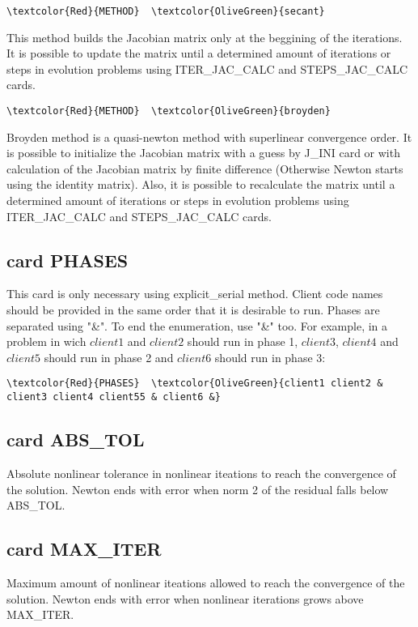 \begin{Verbatim}[frame=single,commandchars=\\\{\}]
\textcolor{Red}{METHOD}  \textcolor{OliveGreen}{secant} 
\end{Verbatim}
This method builds the Jacobian matrix only at the beggining of the iterations. It is possible to update the matrix until a determined amount of iterations or steps in evolution problems using ITER_JAC_CALC and STEPS_JAC_CALC cards.

\begin{Verbatim}[frame=single,commandchars=\\\{\}]
\textcolor{Red}{METHOD}  \textcolor{OliveGreen}{broyden}
\end{Verbatim}
Broyden method is a quasi-newton method with superlinear convergence order. It is possible to initialize the Jacobian matrix with a guess by J_INI card or with calculation of the Jacobian matrix by finite difference (Otherwise Newton starts using the identity matrix). Also, it is possible to recalculate the matrix until a determined amount of iterations or steps in evolution problems using ITER_JAC_CALC and STEPS_JAC_CALC cards.

\subsection{card PHASES}
This card is only necessary using explicit_serial method. Client code names should be provided in the same order that it is desirable to run. Phases are separated using "&". To end the enumeration, use "&" too. For example, in a problem in wich $client1$ and $client2$ should run in phase 1, $client3$, $client4$ and $client5$ should run in phase 2 and $client6$ should run in phase 3:
\begin{Verbatim}[frame=single,commandchars=\\\{\}]
\textcolor{Red}{PHASES}  \textcolor{OliveGreen}{client1 client2 & client3 client4 client55 & client6 &}
\end{Verbatim}

\subsection{card ABS_TOL}
Absolute nonlinear tolerance in nonlinear iteations to reach the convergence of the solution. Newton ends with error when norm 2 of the residual falls below ABS_TOL.

\subsection{card MAX_ITER}
Maximum amount of nonlinear iteations allowed to reach the convergence of the solution. Newton ends with error when nonlinear iterations grows above MAX_ITER.





